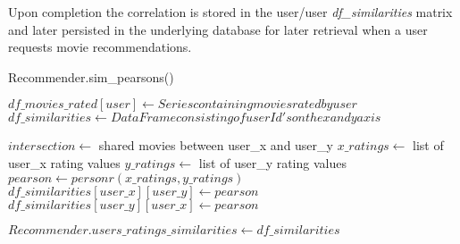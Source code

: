 	Upon completion the correlation is stored in the user/user \textit{df\_similarities} matrix and later persisted in the underlying database for later retrieval when a user requests movie recommendations.

	\begin{algorithm}[H]
		\renewcommand\thealgorithm{}
		\caption{Recommender.sim\_pearsons()}
		\label{algorithm:sim_pearsons}
		\begin{algorithmic}
			\STATE $df\_movies\_rated[user] \leftarrow Series containing movies rated by user$
			\STATE $df\_similarities \leftarrow DataFrame consisting of user Id's on the x and y axis$
			
						\STATE $intersection \leftarrow$ shared movies between user\_x and user\_y
							\STATE $x\_ratings \leftarrow$ list of user\_x rating values
							\STATE $y\_ratings \leftarrow$ list of user\_y rating values
							\STATE $pearson \leftarrow personr(x\_ratings, y\_ratings)$
							\STATE $df\_similarities[user\_x][user\_y] \leftarrow pearson$
							\STATE $df\_similarities[user\_y][user\_x] \leftarrow pearson$
						\ENDIF
					\ENDIF
				\ENDFOR
			\ENDFOR
			
			\STATE $Recommender.users\_ratings\_similarities \leftarrow df\_similarities$
		\end{algorithmic}
	\end{algorithm}

